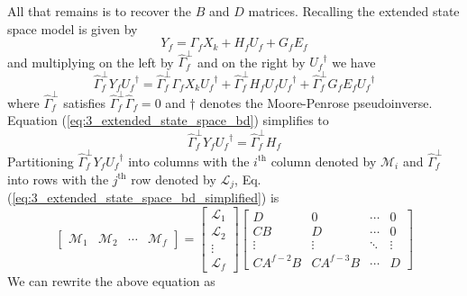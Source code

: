 All that remains is to recover the $B$ and $D$ matrices. Recalling the extended state space model is given by
\begin{equation*}
Y_f = \Gamma_f X_k + H_f U_f + G_f E_f
\end{equation*}
and multiplying on the left by $\hat{\Gamma}_f^\perp$ and on the right by ${U_f}^\dagger$ we have
\begin{equation}\label{eq:3_extended_state_space_bd}
\hat{\Gamma}_f^\perp Y_f {U_f}^\dagger = \hat{\Gamma}_f^\perp\Gamma_f X_k {U_f}^\dagger + \hat{\Gamma}_f^\perp H_f U_f {U_f}^\dagger + \hat{\Gamma}_f^\perp G_f E_f {U_f}^\dagger
\end{equation}
where $\hat{\Gamma}_f^\perp$ satisfies $\hat{\Gamma}_f^\perp\hat{\Gamma}_f = 0$ and $\dagger$ denotes the Moore-Penrose pseudoinverse. Equation (\ref{eq:3_extended_state_space_bd}) simplifies to
\begin{equation}\label{eq:3_extended_state_space_bd_simplified}
\hat{\Gamma}_f^\perp Y_f {U_f}^\dagger = \hat{\Gamma}_f^\perp H_f 
\end{equation}
Partitioning $\hat{\Gamma}_f^\perp Y_f {U_f}^\dagger$ into columns with the $i^{\mbox{th}}$ column denoted by $\mathcal{M}_i$ and $\hat{\Gamma}_f^\perp$ into rows with the $j^{\mbox{th}}$ row denoted by $\mathcal{L}_j$, Eq. (\ref{eq:3_extended_state_space_bd_simplified}) is
\begin{equation*}
\begin{bmatrix}\mathcal{M}_1 & \mathcal{M}_2 & \cdots & \mathcal{M}_f\end{bmatrix} = 
\begin{bmatrix}\mathcal{L}_1\\ \mathcal{L}_2\\ \vdots\\ \mathcal{L}_f\end{bmatrix}
\begin{bmatrix}
D & 0 & \cdots & 0\\
CB & D & \cdots & 0\\
\vdots & \vdots  & \ddots & \vdots\\
CA^{f-2}B & CA^{f-3}B & \cdots & D
\end{bmatrix}
\end{equation*}
We can rewrite the above equation as
